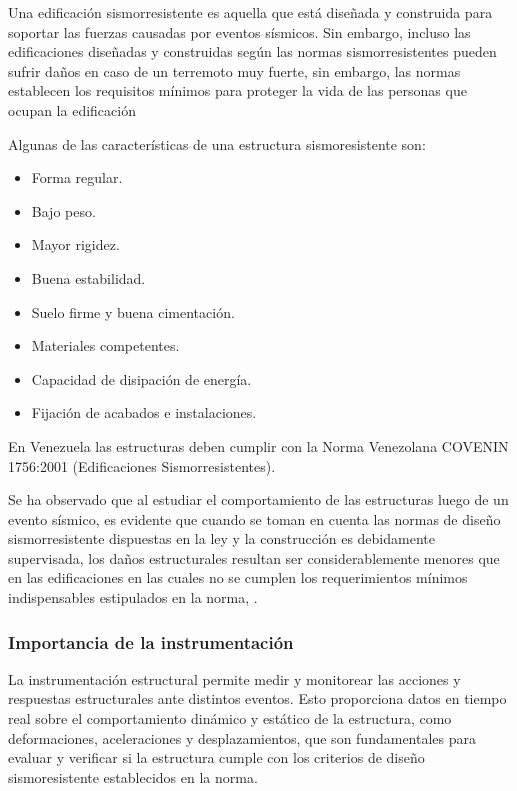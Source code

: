 Una edificación sismorresistente es aquella que está diseñada y construida para soportar las fuerzas causadas por eventos sísmicos. Sin embargo, incluso las edificaciones diseñadas y construidas según las normas sismorresistentes pueden sufrir daños en caso de un terremoto muy fuerte, sin embargo, las normas establecen los requisitos mínimos para proteger la vida de
las personas que ocupan la edificación

Algunas de las características de una estructura sismoresistente son:

        \begin{itemize}
            \item Forma regular.
            \item Bajo peso.
            \item Mayor rigidez.
            \item Buena estabilidad.
            \item Suelo firme y buena cimentación.
            \item Materiales competentes.
            \item Capacidad de disipación de energía.
            \item Fijación de acabados e instalaciones.
        \end{itemize}

En Venezuela las estructuras deben cumplir con la Norma Venezolana COVENIN 1756:2001 (Edificaciones Sismorresistentes).

Se ha observado que al estudiar el comportamiento de las estructuras luego de un evento sísmico, es evidente que cuando se toman en cuenta las normas de diseño sismorresistente dispuestas en la ley y la construcción es debidamente supervisada, los daños estructurales resultan ser considerablemente menores que en las edificaciones en las cuales no se cumplen los requerimientos mínimos indispensables estipulados en la norma, \citep{blanco2012criterios}.

\subsubsection{Importancia de la instrumentación} La instrumentación estructural permite medir y monitorear las acciones y respuestas estructurales ante distintos eventos. Esto proporciona datos en tiempo real sobre el comportamiento dinámico y estático de la estructura, como deformaciones, aceleraciones y desplazamientos, que son fundamentales para evaluar y verificar si la estructura cumple con los criterios de diseño sismoresistente establecidos en la norma.

